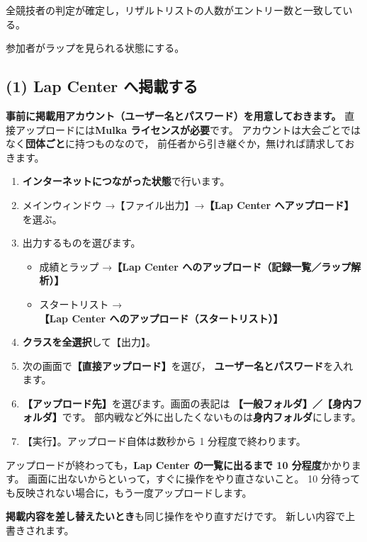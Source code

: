 \begin{Done}
全競技者の判定が確定し，リザルトリストの人数がエントリー数と一致している。
\end{Done}


\begin{Goal}
参加者がラップを見られる状態にする。
\end{Goal}

\subsection*{(1) Lap Center へ掲載する}

\textbf{事前に掲載用アカウント（ユーザー名とパスワード）を用意しておきます。}
直接アップロードには\textbf{Mulka ライセンスが必要}です。
アカウントは大会ごとではなく\textbf{団体ごと}に持つものなので，
前任者から引き継ぐか，無ければ請求しておきます。

\begin{enumerate}
\item \textbf{インターネットにつながった状態}で行います。
\item メインウィンドウ →【ファイル出力】→\textbf{【Lap Center へアップロード】}を選ぶ。\ver
\item 出力するものを選びます。
  \begin{itemize}
  \item 成績とラップ →\textbf{【Lap Center へのアップロード（記録一覧／ラップ解析）】}
  \item スタートリスト →\textbf{【Lap Center へのアップロード（スタートリスト）】}
  \end{itemize}
\item \textbf{クラスを全選択}して【出力】。
\item 次の画面で\textbf{【直接アップロード】}を選び，
      \textbf{ユーザー名とパスワード}を入れます。
\item \textbf{【アップロード先】}を選びます。画面の表記は
      \textbf{【一般フォルダ】／【身内フォルダ】}です。
      部内戦など外に出したくないものは\textbf{身内フォルダ}にします。
\item 【実行】。アップロード自体は数秒から 1 分程度で終わります。
\end{enumerate}

\begin{Note}
アップロードが終わっても，\textbf{Lap Center の一覧に出るまで 10 分程度}かかります。
画面に出ないからといって，すぐに操作をやり直さないこと。
10 分待っても反映されない場合に，もう一度アップロードします。

\textbf{掲載内容を差し替えたいとき}も同じ操作をやり直すだけです。
新しい内容で上書きされます。
\end{Note}

